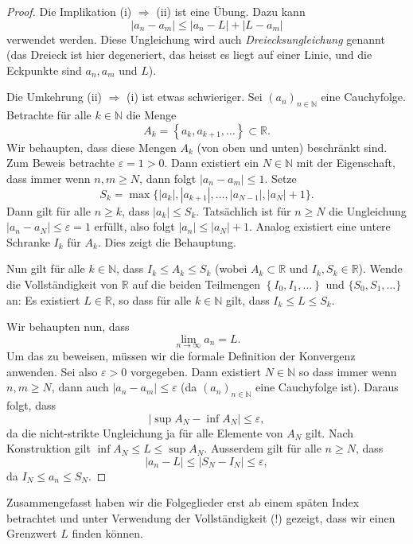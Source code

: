 \documentclass[../main.tex]{subfiles}
\begin{document}
\begin{proof}
  Die Implikation (i) $\Rightarrow$ (ii) ist eine Übung.
  Dazu kann  
  \[
    |a_n - a_m| \leq |a_n - L| + |L - a_m|
  \]
  verwendet werden. Diese Ungleichung wird auch
  \emph{Dreiecksungleichung} genannt (das Dreieck
  ist hier degeneriert, das heisst es liegt
  auf einer Linie, und die Eckpunkte sind
  $a_n, a_m$ und $L$).

  Die Umkehrung (ii) $\Rightarrow$ (i) ist etwas schwieriger.
Sei ${\left( a_n \right)}_{n \in \mathbb{N}}$ eine
  Cauchyfolge.
  Betrachte für alle $k \in \mathbb{N}$ die Menge
  \[
    A_k = \left\{ a_{k}, a_{k+1}, \dots \right\}
    \subset \mathbb{R}.
  \]
  Wir behaupten, dass diese Mengen $A_k$
  (von oben und unten)
  beschränkt sind.
  Zum Beweis betrachte $\varepsilon = 1 > 0$.
  Dann existiert ein $N \in \mathbb{N}$ mit
  der Eigenschaft, dass immer wenn
  $n, m \geq N$, dann folgt
  $|a_n - a_m| \leq 1$.
  Setze
  \[
  S_k = \max \{|a_k|, |a_{k+1}|, \dots, |a_{N-1}|, |a_N| + 1\}.
  \]
  Dann gilt für alle $n \geq k$, dass $|a_k| \leq S_k$.
  Tatsächlich ist für $n \geq N$ die Ungleichung
  $|a_n - a_N| \leq \varepsilon = 1$
  erfüllt, also folgt $|a_n| \leq |a_N| + 1$.
  Analog existiert eine untere Schranke $I_k$ für 
  $A_k$.
  Dies zeigt die Behauptung.

  Nun gilt für alle $k \in \mathbb{N}$, dass
  $I_k \leq A_k \leq S_k$ (wobei $A_k \subset \mathbb{R}$
  und $I_k, S_k \in \mathbb{R}$).
  Wende die Vollständigkeit von $\mathbb{R}$ 
  auf die beiden Teilmengen
  $\left\{ I_0, I_1, \dots \right\} $
  und $\{S_0, S_1, \dots\}$ an: Es existiert
  $L \in \mathbb{R}$, so dass für alle
  $k \in \mathbb{N}$ gilt, dass $I_k \leq L \leq S_k$.

  Wir behaupten nun, dass
  \[
    \lim_{n \to \infty} a_n = L.
  \]
  Um das zu beweisen, müssen wir die formale
  Definition der Konvergenz anwenden.
  Sei also $\varepsilon > 0$ vorgegeben.
  Dann existiert $N \in \mathbb{N}$ 
  so dass immer wenn $n, m \geq N$, dann auch
  $|a_n - a_m| \leq \varepsilon$
  (da ${(a_n)}_{n \in \mathbb{N}}$ eine Cauchyfolge ist).
  Daraus folgt, dass
  \[
    |\sup A_N - \inf A_N| \leq \varepsilon,
  \]
  da die nicht-strikte Ungleichung ja für alle
  Elemente von $A_N$ gilt.
  Nach Konstruktion gilt $\inf A_N \leq L \leq \sup A_N$.
  Ausserdem gilt für alle $n \geq N$, dass
  \[
    |a_n - L| \leq |S_N - I_N| \leq \varepsilon,
  \]
  da $I_N \leq a_n \leq S_N$.
\end{proof}

Zusammengefasst haben wir die Folgeglieder
erst ab einem späten Index betrachtet und
unter Verwendung der Vollständigkeit (!)
gezeigt, dass wir einen Grenzwert $L$
finden können.
\end{document}
